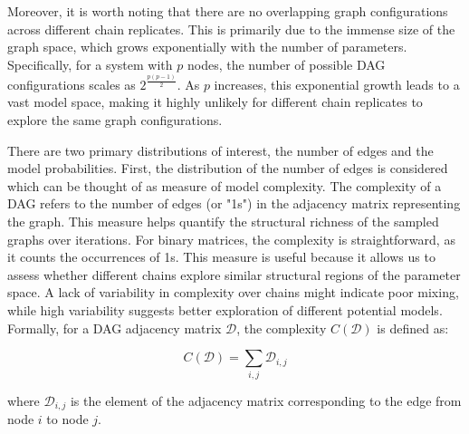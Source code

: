 \documentclass{report}
\begin{document}
Moreover, it is worth noting that there are no overlapping graph configurations across different chain replicates. This is primarily due to the immense size of the graph space, which grows exponentially with the number of parameters. Specifically, for a system with $p$ nodes, the number of possible DAG configurations scales as $2^{\frac{p(p-1)}{2}}$. As $p$ increases, this exponential growth leads to a vast model space, making it highly unlikely for different chain replicates to explore the same graph configurations. \hfill \break

There are two primary distributions of interest, the number of edges and the model probabilities. First, the distribution of the number of edges is considered which can be thought of as measure of model complexity.
The complexity of a DAG refers to the number of edges (or "1s") in the adjacency matrix representing the graph. This measure helps quantify the structural richness of the sampled graphs over iterations. For binary matrices, the complexity is straightforward, as it counts the occurrences of 1s. This measure is useful because it allows us to assess whether different chains explore similar structural regions of the parameter space. A lack of variability in complexity over chains might indicate poor mixing, while high variability suggests better exploration of different potential models.  Formally, for a DAG adjacency matrix $\mathcal{D}$, the complexity $C(\mathcal{D})$ is defined as:

$$
C(\mathcal{D}) = \sum_{i,j} \mathcal{D}_{i,j}
$$

where $\mathcal{D}_{i,j}$ is the element of the adjacency matrix corresponding to the edge from node $i$ to node $j$.
\end{document}
